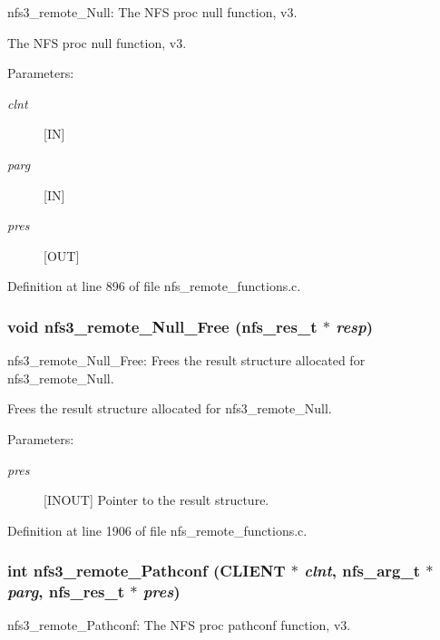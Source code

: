 nfs3\_\-remote\_\-Null: The NFS proc null function, v3.

The NFS proc null function, v3.

\begin{Desc}
\item[Parameters:]
\begin{description}
\item[{\em clnt}][IN] \item[{\em parg}][IN] \item[{\em pres}][OUT] \end{description}
\end{Desc}


Definition at line 896 of file nfs\_\-remote\_\-functions.c.
\subsubsection{\setlength{\rightskip}{0pt plus 5cm}void nfs3\_\-remote\_\-Null\_\-Free (nfs\_\-res\_\-t $\ast$ {\em resp})}\label{group__NFSprocs_ga72}


nfs3\_\-remote\_\-Null\_\-Free: Frees the result structure allocated for nfs3\_\-remote\_\-Null.

Frees the result structure allocated for nfs3\_\-remote\_\-Null.

\begin{Desc}
\item[Parameters:]
\begin{description}
\item[{\em pres}][INOUT] Pointer to the result structure. \end{description}
\end{Desc}


Definition at line 1906 of file nfs\_\-remote\_\-functions.c.
\subsubsection{\setlength{\rightskip}{0pt plus 5cm}int nfs3\_\-remote\_\-Pathconf (CLIENT $\ast$ {\em clnt}, nfs\_\-arg\_\-t $\ast$ {\em parg}, nfs\_\-res\_\-t $\ast$ {\em pres})}\label{group__NFSprocs_ga37}


nfs3\_\-remote\_\-Pathconf: The NFS proc pathconf function, v3.

